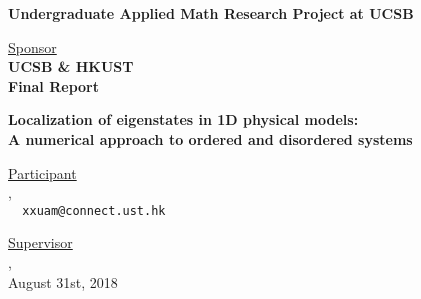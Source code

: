 \thispagestyle{empty}

\def\shiftdowna{0.32in}  %
\def\shiftdownb{0.22in}  %


\begin{center}
\textbf{{\large Undergraduate Applied Math Research Project at UCSB}}\\

\vspace \shiftdowna

\vspace \shiftdowna
\underline {Sponsor}\\ 
\vspace{5pt}
\textbf{{\large UCSB \& HKUST}}\\
\vspace \shiftdowna
\textbf{Final Report}

\vspace \shiftdowna
\textbf{\Large Localization of eigenstates in 1D physical models: \\A numerical approach to ordered and disordered systems}


\vspace{0.35in}
\underline {Participant}\\
\vspace{5pt}
 , \\ 
\vspace{3pt}
\texttt{\Letter \,\,xxuam@connect.ust.hk}\\
\vspace{5pt}

\vspace \shiftdownb
\underline {Supervisor} \\
\vspace{5pt}
, \\ 



\vspace \shiftdowna
August 31st, 2018

\end{center}


